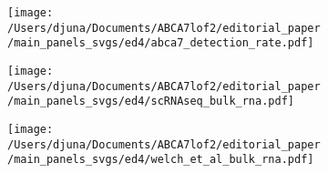 \documentclass[12pt]{article}
\begin{document}
\begin{figure}[H]
    \begin{subfigure}[t]{.25\textwidth}
        \caption{}
        \texttt{[image: /Users/djuna/Documents/ABCA7lof2/editorial\_paper/main\_panels\_svgs/ed4/abca7\_detection\_rate.pdf]}        
    \end{subfigure}
    \par
    \begin{subfigure}[t]{\textwidth}
        \caption{}
        \texttt{[image: /Users/djuna/Documents/ABCA7lof2/editorial\_paper/main\_panels\_svgs/ed4/scRNAseq\_bulk\_rna.pdf]}        
    \end{subfigure}
    \par
    \begin{subfigure}[t]{\textwidth}
        \caption{}
        \texttt{[image: /Users/djuna/Documents/ABCA7lof2/editorial\_paper/main\_panels\_svgs/ed4/welch\_et\_al\_bulk\_rna.pdf]}        
    \end{subfigure}
\end{figure}
\end{document}
